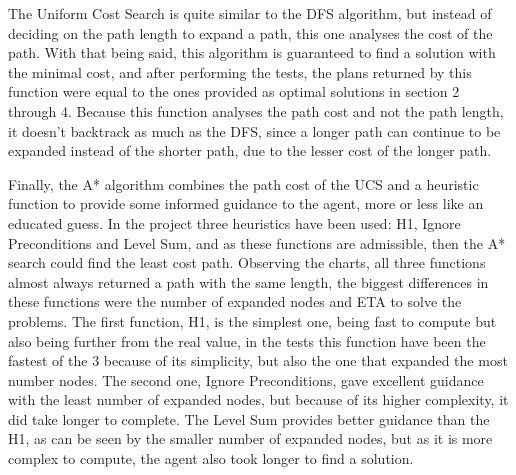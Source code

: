 The Uniform Cost Search is quite similar to the DFS algorithm, but instead of deciding on the path length to expand a path, this one analyses the cost of the path. With that being said, this algorithm is guaranteed to find a solution with the minimal cost, and after performing the tests, the plans returned by this function were equal to the ones provided as optimal solutions in section 2 through 4. Because this function analyses the path cost and not the path length, it doesn't backtrack as much as the DFS, since a longer path can continue to be expanded instead of the shorter path, due to the lesser cost of the longer path.

Finally, the A* algorithm combines the path cost of the UCS and a heuristic function to provide some informed guidance to the agent, more or less like an educated guess. In the project three heuristics have been used: H1, Ignore Preconditions and Level Sum, and as these functions are admissible, then the A* search could find the least cost path. Observing the charts, all three functions almost always returned a path with the same length, the biggest differences in these functions were the number of expanded nodes and ETA to solve the problems. The first function, H1, is the simplest one, being fast to compute but also being further from the real value, in the tests this function have been the fastest of the 3 because of its simplicity, but also the one that expanded the most number nodes. The second one, Ignore Preconditions, gave excellent guidance with the least number of expanded nodes, but because of its higher complexity, it did take longer to complete. The Level Sum provides better guidance than the H1, as can be seen by the smaller number of expanded nodes, but as it is more complex to compute, the agent also took longer to find a solution.


